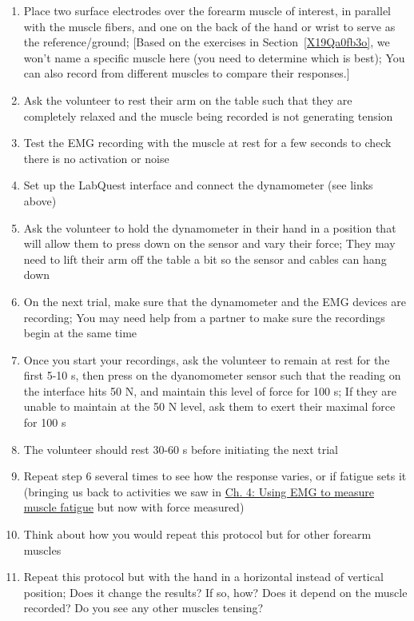 \documentclass{article}
\begin{document}
\begin{enumerate}
\item Place two surface electrodes over the forearm muscle of interest, in parallel with the muscle fibers, and one on the back of the hand or wrist to serve as the reference/ground; [Based on the exercises in Section~\ref{X19Qa0fb3o}, we won't name a specific muscle here (you need to determine which is best); You can also record from different muscles to compare their responses.]
\item Ask the volunteer to rest their arm on the table such that they are completely relaxed and the muscle being recorded is not generating tension
\item Test the EMG recording with the muscle at rest for a few seconds to check there is no activation or noise
\item Set up the LabQuest interface and connect the dynamometer (see links above)
\item Ask the volunteer to hold the dynamometer in their hand in a position that will allow them to press down on the sensor and vary their force; They may need to lift their arm off the table a bit so the sensor and cables can hang down
\item On the next trial, make sure that the dynamometer and the EMG devices are recording; You may need help from a partner to make sure the recordings begin at the same time
\item Once you start your recordings, ask the volunteer to remain at rest for the first 5-10 s, then press on the dyanomometer sensor such that the reading on the interface hits 50 N, and maintain this level of force for 100 s; If they are unable to maintain at the 50 N level, ask them to exert their maximal force for 100 s
\item The volunteer should rest 30-60 s before initiating the next trial
\item Repeat step 6 several times to see how the response varies, or if fatigue sets it (bringing us back to activities we saw in \href{https://curvenote.com/oxa:EPpXta8zJdzN048lz8AR/oZzZ9YkLDYhuIWC3d5Sk}{Ch. 4: Using EMG to measure muscle fatigue} but now with force measured)
\item Think about how you would repeat this protocol but for other forearm muscles
\item Repeat this protocol but with the hand in a horizontal instead of vertical position; Does it change the results? If so, how? Does it depend on the muscle recorded? Do you see any other muscles tensing?
\end{enumerate}
\end{document}
